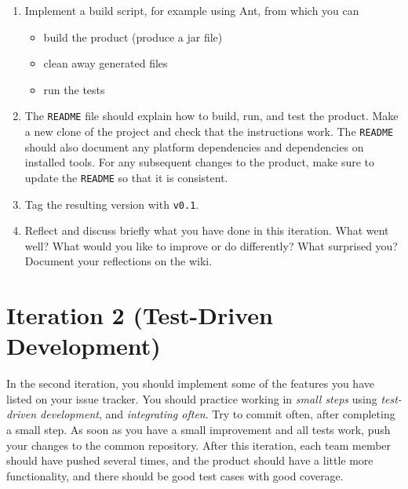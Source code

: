 \documentclass[swedish,english]{article}
\begin{document}
\begin{enumerate}
\item Implement a build script, for example using Ant, from which you can
\begin{itemize}
  \item build the product (produce a jar file)
  \item clean away generated files
  \item run the tests
\end{itemize}

\item The \verb'README' file should explain how to build, run, and test the product. Make a new clone of the project and check that the instructions work. The \verb'README' should also document any platform dependencies and dependencies on installed tools. For any subsequent changes to the product, make sure to update the \verb'README' so that it is consistent.

\item Tag the resulting version with \verb'v0.1'.

\item Reflect and discuss briefly what you have done in this iteration. What went well? What would you like to improve or do differently? What surprised you? Document your reflections on the wiki.
\end{enumerate}

\section*{Iteration 2 (Test-Driven Development)}
In the second iteration, you should implement some of the features you have listed on your issue tracker. You should practice working in \emph{small steps} using \emph{test-driven development}, and \emph{integrating often}. Try to commit often, after completing a small step. As soon as you have a small improvement and all tests work, push your changes to the common repository. After this iteration, each team member should have pushed several times, and the product should have a little more functionality, and there should be good test cases with good coverage.
\end{document}

